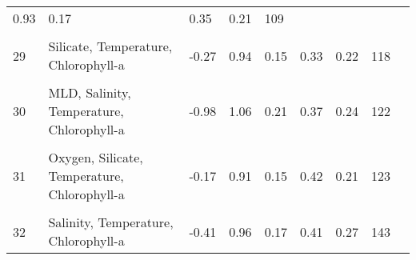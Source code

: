 \begin{table}[h]
\begin{tabularx}{\textwidth}{lXlllllll}
  0.93 &
  0.17 &
  0.35 &
  0.21 &
  109 \\ \\
29 &
  Silicate, Temperature, Chlorophyll-a &
  -0.27 &
  0.94 &
  0.15 &
  0.33 &
  0.22 &
  118 \\ \\
30 &
  MLD, Salinity, Temperature, Chlorophyll-a &
  -0.98 &
  1.06 &
  0.21 &
  0.37 &
  0.24 &
  122 \\ \\
31 &
  Oxygen, Silicate, Temperature, Chlorophyll-a &
  -0.17 &
  0.91 &
  0.15 &
  0.42 &
  0.21 &
  123 \\ \\
32 &
 Salinity, Temperature, Chlorophyll-a &
  -0.41 &
  0.96 &
  0.17 &
  0.41 &
  0.27 &
  143 \\ \bottomrule
\end{tabularx}
\end{table}
